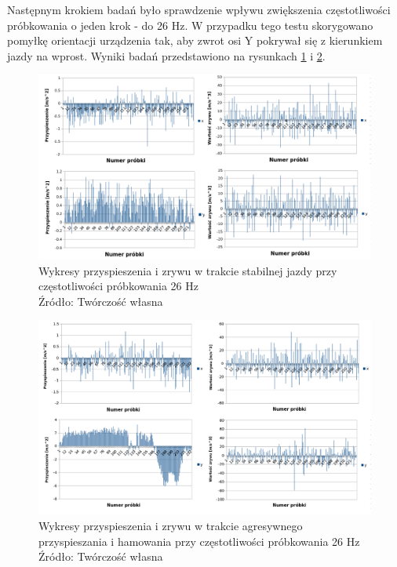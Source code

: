 Następnym krokiem badań było sprawdzenie wpływu zwiększenia częstotliwości próbkowania o jeden krok - do 26 Hz. W przypadku tego testu skorygowano pomyłkę orientacji urządzenia tak, aby zwrot osi Y pokrywał się z kierunkiem jazdy na wprost. Wyniki badań przedstawiono na rysunkach \ref{fig:image_driving_analysis_test_26Hz} i \ref{fig:image_driving_analysis_test_acc_26Hz}.

\begin{figure}[H]
	\centering
	\includegraphics[width=18cm]{img/driving_analysis/stabilna_26.png}
	\caption{Wykresy przyspieszenia i zrywu w trakcie stabilnej jazdy przy częstotliwości próbkowania 26 Hz
	\\Źródło: Twórczość własna}
	\label{fig:image_driving_analysis_test_26Hz}
\end{figure}

\begin{figure}[H]
	\centering
	\includegraphics[width=18cm]{img/driving_analysis/Ostre_przyspieszenie_26Hz.png}
	\caption{Wykresy przyspieszenia i zrywu w trakcie agresywnego przyspieszania i hamowania przy częstotliwości próbkowania 26 Hz
	\\Źródło: Twórczość własna}
	\label{fig:image_driving_analysis_test_acc_26Hz}
\end{figure}

